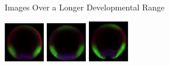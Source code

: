 \documentclass[10pt]{beamer}
\begin{document}
\begin{frame}{Images Over a Longer Developmental Range}

\def\imwidth{0.7in}

\begin{center}
\includegraphics[width=\imwidth]{longtime2}
\hspace{0.2in}
\includegraphics[width=\imwidth]{longtime3}
\hspace{0.2in}
\includegraphics[width=\imwidth]{longtime4}

\end{center}
\end{frame}
\end{document}
